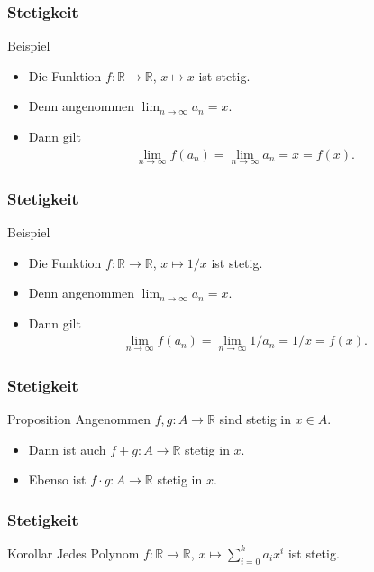 \documentclass{beamer}
\newcommand\RR{\mathbb R}
\newcommand{\mytitle}{Stetigkeit}
\begin{document}
\begin{frame}\frametitle{\mytitle}
	\begin{block}{Beispiel}
		\begin{itemize}
			\item Die Funktion $f:\RR\to\RR$, $x\mapsto x$ ist stetig.
			\item Denn angenommen $\lim_{n\to\infty}a_n=x$.
			\item Dann gilt
				\begin{align*}
					\lim_{n\to\infty}f(a_n)=\lim_{n\to\infty}a_n=x=f(x).
				\end{align*}
		\end{itemize}
	\end{block}
\end{frame}

\begin{frame}\frametitle{\mytitle}
	\begin{block}{Beispiel}
		\begin{itemize}
			\item Die Funktion $f:\RR\to\RR$, $x\mapsto 1/x$ ist stetig.
			\item Denn angenommen $\lim_{n\to\infty}a_n=x$.
			\item Dann gilt
				\begin{align*}
					\lim_{n\to\infty}f(a_n)=\lim_{n\to\infty}1/a_n=1/x=f(x).
				\end{align*}
		\end{itemize}
	\end{block}
\end{frame}

\begin{frame}\frametitle{\mytitle}
	\begin{block}{Proposition}
		Angenommen $f,g:A\to\RR$ sind stetig in $x\in A$.
		\begin{itemize}
			\item Dann ist auch $f+g:A\to\RR$ stetig in $x$.
			\item Ebenso ist $f\cdot g:A\to\RR$ stetig in $x$.
		\end{itemize}
	\end{block}
\end{frame}

\begin{frame}\frametitle{\mytitle}
	\begin{block}{Korollar}
		Jedes Polynom $f:\RR\to\RR$, $x\mapsto\sum_{i=0}^ka_ix^i$ ist stetig.
	\end{block}
\end{frame}
\end{document}

